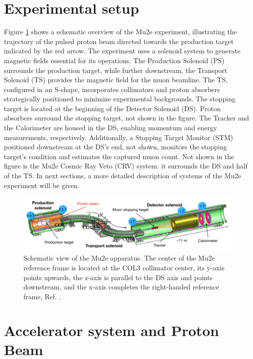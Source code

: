 \section{Experimental setup}\label{setup}
Figure \ref{fig:mu2escheme} shows a schematic overview of the Mu2e experiment, illustrating the trajectory of the pulsed proton beam directed towards the production target indicated by the red arrow. The experiment uses a solenoid system to generate magnetic fields essential for its operations. The Production Solenoid (PS) surrounds the production target, while further downstream, the Transport Solenoid (TS) provides the magnetic field for the muon beamline. The TS, configured in an S-shape, incorporates collimators and proton absorbers strategically positioned to minimize experimental backgrounds. The stopping target is located at the beginning of the Detector Solenoid (DS). Proton absorbers surround the stopping target, not shown in the figure. The Tracker and the Calorimeter are housed in the DS, enabling momentum and energy measurements, respectively. Additionally, a Stopping Target Monitor (STM) positioned downstream at the DS's end, not shown, monitors the stopping target's condition and estimates the captured muon count. Not shown in the figure is the Mu2e Cosmic Ray Veto (CRV) system: it surrounds the DS and half of the TS. In next sections, a more detailed description of systems of the Mu2e experiment will be given.
\begin{figure}[!h]
\centering
\includegraphics[width =\textwidth]{images/chapter2/Screenshot_20240301_143105.png}
\caption{Schematic view of the Mu2e apparatus. The center of the Mu2e reference frame is located at the COL3 collimator center, its y-axis points upwards, the z-axis is parallel to the DS axis and points downstream, and the x-axis completes the right-handed reference frame, Ref. \cite{universe9010054}.}
\label{fig:mu2escheme}
\end{figure}
\section{Accelerator system and Proton Beam}\label{accel}
